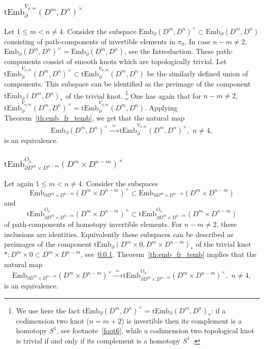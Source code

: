 \documentclass[11pt]{amsart}
\theoremstyle{definition}
\newcommand{\Embmn}{\mathrm{Emb}_\partial(D^m,D^n)}
\newcommand{\tEmbmn}{\mathrm{tEmb}_\partial(D^m,D^n)}
\newcommand{\Emb}{\mathrm{Emb}}
\newcommand{\tEmb}{\mathrm{tEmb}}
\numberwithin{equation}{section}
\begin{document}
\subsubsection{$\tEmb_\partial^{\underline{V_{n,m}}}(D^m,D^n)^{\times}$}\label{sss:embmn_tembmn}
Let $1\leq m< n\neq 4$. Consider the subspace $\Emb_\partial(D^m,D^n)^\times\subset \Embmn$ consisting of path-components 
of invertible elements in $\pi_0$. In case $n-m\neq 2$, $\Emb_\partial(D^m,D^n)^{\times}= \Embmn$, see the Introduction.
These path-components consist of smooth knots which are topologically trivial. Let $\tEmb_\partial^{\underline{V_{n,m}}}(D^m,D^n)^{\times} \subset \tEmb_\partial^{\underline{V_{n,m}}}(D^m,D^n)$ 
be the similarly defined  union of components. 
This subspace can be identified as the preimage of the component $\tEmbmn_*$ of the trivial knot.%
\footnote{We use here the fact $\tEmb_\partial(D^m,D^n)^\times =\tEmb_\partial(D^m,D^n)_*$:  if a codimension two knot ($n=m+2$) is invertible then its complement is a homotopy $S^1$, see footnote~\ref{foot6}, while a codimension two topological knot 
 is trivial if and only if its complement is a homotopy $S^1$ \cite{Stallings}.}  One has again that for $n-m\neq 2$, $\tEmb_\partial^{\underline{V_{n,m}}}(D^m,D^n)^\times = \tEmb_\partial^{\underline{V_{n,m}}}(D^m,D^n)$. Applying Theorem~\ref{th:emb_fr_temb},  
 we get that the natural map
\begin{equation}\label{eq:embmn_tembmn}
\Emb_\partial(D^m,D^n)^{\times} \xrightarrow{\,\,\simeq\,\,} \tEmb_\partial^{\underline{V_{n,m}}}(D^m,D^n)^{\times},\,\, n\neq 4,
\end{equation}
is an equivalence.


\subsubsection{$\tEmb_{\partial D^m\times D^{n-m}}^{\underline{O_n}}(D^m\times D^{n-m})^{\times}$}\label{sss:emb_dm_dn}
Let again $1\leq m<n\neq 4$.
Consider the subspaces 
$$\Emb_{\partial D^m\times D^{n-m}}(D^m\times D^{n-m})^{\times}\subset \Emb_{\partial D^m\times D^{n-m}}(D^m\times D^{n-m})$$  and  
$$\tEmb_{\partial D^m\times D^{n-m}}^{\underline{O_n}}(D^m\times D^{n-m})^{\times}
\subset \tEmb_{\partial D^m\times D^{n-m}}^{\underline{O_n}}(D^m\times D^{n-m})$$
 of path-components of homotopy invertible elements. For $n-m\neq 2$,
these inclusions are identities. Equivalently these subspaces can be described as preimages of the component
$\tEmb_\partial(D^m\times 0,D^m\times D^{n-m})_*$ of the trivial knot $*: D^m\times 0\subset D^m\times D^{n-m}$, see~\ref{sss:embmn_tembmn}. 
 Theorem~\ref{th:emb_fr_temb} implies that  the natural map
\begin{equation}\label{eq:emb_dm_dn}
\Emb_{\partial D^m\times D^{n-m}}(D^m\times D^{n-m})^{\times}\xrightarrow{\,\,\simeq\,\,} 
\tEmb_{\partial D^m\times D^{n-m}}^{\underline{O_n}}(D^m\times D^{n-m})^{\times},\,\, n\neq 4,
\end{equation}
is an equivalence.
\end{document}
